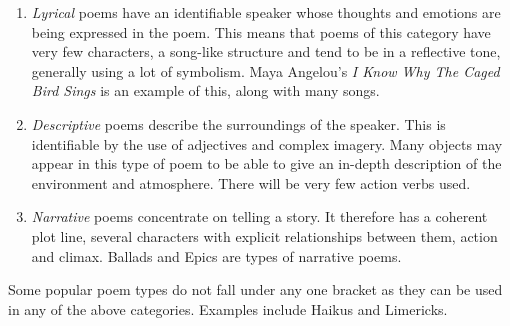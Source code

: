\begin{enumerate}
\item{\textit{Lyrical} poems have an identifiable speaker whose thoughts and emotions are being expressed in the poem. This means that poems of this category have very few characters, a song-like structure and tend to be in a reflective tone, generally using a lot of symbolism. Maya Angelou's \textit{I Know Why The Caged Bird Sings} is an example of this, along with many songs.}
\item{\textit{Descriptive} poems describe the surroundings of the speaker. This is identifiable by the use of adjectives and complex imagery. Many objects may appear in this type of poem to be able to give an in-depth description of the environment and atmosphere. There will be very few action verbs used.}
\item{\textit{Narrative} poems concentrate on telling a story. It therefore has a coherent plot line, several characters with explicit relationships between them, action and climax. Ballads and Epics are types of narrative poems.}
\end{enumerate}

Some popular poem types do not fall under any one bracket as they can be used in any of the above categories. Examples include Haikus and Limericks.

